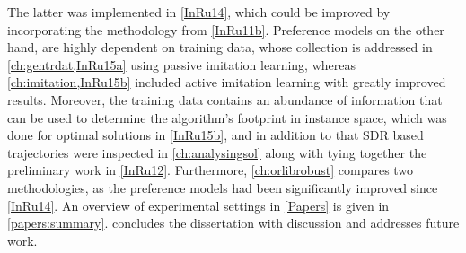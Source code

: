 The latter was implemented in \cref{InRu14}, which could be improved by 
incorporating the methodology from \cref{InRu11b}.
Preference models on  the other hand, are highly dependent on training data, 
whose collection is addressed in \cref{ch:gentrdat,InRu15a} using passive 
imitation learning, whereas \cref{ch:imitation,InRu15b} included active 
imitation learning with greatly improved results. 
Moreover, the training data contains an abundance of information that can be 
used to determine the algorithm's footprint in instance space, which was done 
for optimal solutions in \cref{InRu15b}, and in addition to that SDR based 
trajectories were inspected in \cref{ch:analysingsol} along with tying together 
the preliminary work in \cref{InRu12}. 
Furthermore, \cref{ch:orlibrobust} compares two methodologies, as the 
preference models had been significantly improved since \cref{InRu14}.
An overview of experimental settings in \cref{Papers} is given in 
\cref{papers:summary}. 
 concludes the dissertation with discussion and addresses 
future work.
    


